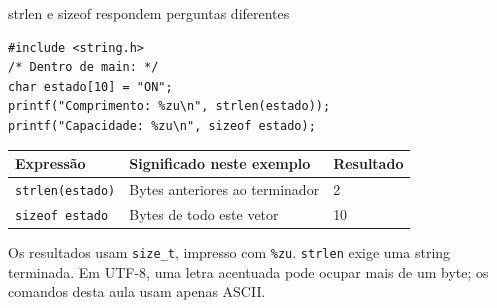 \begin{frame}[fragile]{strlen e sizeof respondem perguntas diferentes}
\begin{lstlisting}
#include <string.h>
/* Dentro de main: */
char estado[10] = "ON";
printf("Comprimento: %zu\n", strlen(estado));
printf("Capacidade: %zu\n", sizeof estado);
\end{lstlisting}
\begin{tabularx}{\textwidth}{lXl}
\toprule
Expressão & Significado neste exemplo & Resultado \\
\midrule
\texttt{strlen(estado)} & Bytes anteriores ao terminador & 2 \\
\texttt{sizeof estado} & Bytes de todo este vetor & 10 \\
\bottomrule
\end{tabularx}
\vspace{0.25cm}
\small Os resultados usam \texttt{size\_t}, impresso com \texttt{\%zu}. \texttt{strlen} exige uma string terminada. Em UTF-8, uma letra acentuada pode ocupar mais de um byte; os comandos desta aula usam apenas ASCII.
\end{frame}

